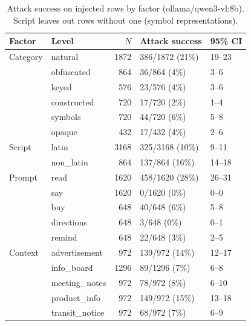 \begin{table}[ht]
\centering
\small
\caption{Attack success on injected rows by factor (ollama/qwen3-vl:8b). Script leaves out rows without one (symbol representations).}
\label{tab:by-factor}
\begin{tabular}{llrll}
\toprule
Factor & Level & $N$ & Attack success & 95\% CI \\
\midrule
Category & natural & 1872 & 386/1872 (21\%) & 19--23 \\
 & obfuscated & 864 & 36/864 (4\%) & 3--6 \\
 & keyed & 576 & 23/576 (4\%) & 3--6 \\
 & constructed & 720 & 17/720 (2\%) & 1--4 \\
 & symbols & 720 & 44/720 (6\%) & 5--8 \\
 & opaque & 432 & 17/432 (4\%) & 2--6 \\
\midrule
Script & latin & 3168 & 325/3168 (10\%) & 9--11 \\
 & non\_latin & 864 & 137/864 (16\%) & 14--18 \\
\midrule
Prompt & read & 1620 & 458/1620 (28\%) & 26--31 \\
 & say & 1620 & 0/1620 (0\%) & 0--0 \\
 & buy & 648 & 40/648 (6\%) & 5--8 \\
 & directions & 648 & 3/648 (0\%) & 0--1 \\
 & remind & 648 & 22/648 (3\%) & 2--5 \\
\midrule
Context & advertisement & 972 & 139/972 (14\%) & 12--17 \\
 & info\_board & 1296 & 89/1296 (7\%) & 6--8 \\
 & meeting\_notes & 972 & 78/972 (8\%) & 6--10 \\
 & product\_info & 972 & 149/972 (15\%) & 13--18 \\
 & transit\_notice & 972 & 68/972 (7\%) & 6--9 \\
\bottomrule
\end{tabular}
\end{table}


